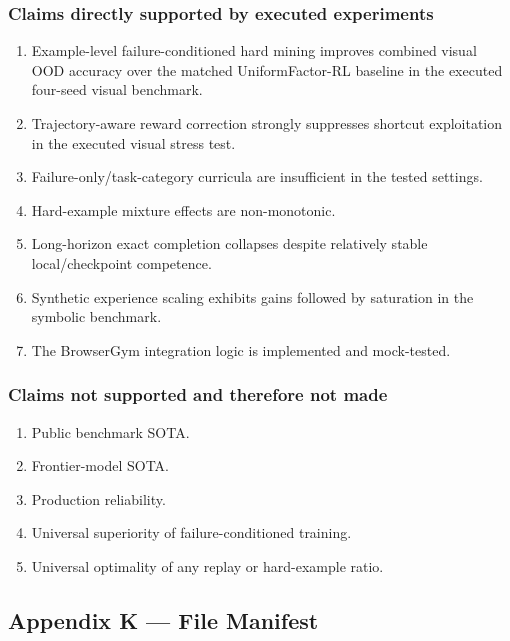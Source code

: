 \documentclass[
]{article}
\providecommand{\tightlist}{%
  \setlength{\itemsep}{0pt}\setlength{\parskip}{0pt}}
\begin{document}
\subsubsection{Claims directly supported by executed
experiments}\label{claims-directly-supported-by-executed-experiments}

\begin{enumerate}
\def\labelenumi{\arabic{enumi}.}
\tightlist
\item
  Example-level failure-conditioned hard mining improves combined visual
  OOD accuracy over the matched UniformFactor-RL baseline in the
  executed four-seed visual benchmark.
\item
  Trajectory-aware reward correction strongly suppresses shortcut
  exploitation in the executed visual stress test.
\item
  Failure-only/task-category curricula are insufficient in the tested
  settings.
\item
  Hard-example mixture effects are non-monotonic.
\item
  Long-horizon exact completion collapses despite relatively stable
  local/checkpoint competence.
\item
  Synthetic experience scaling exhibits gains followed by saturation in
  the symbolic benchmark.
\item
  The BrowserGym integration logic is implemented and mock-tested.
\end{enumerate}

\subsubsection{Claims not supported and therefore not
made}\label{claims-not-supported-and-therefore-not-made}

\begin{enumerate}
\def\labelenumi{\arabic{enumi}.}
\tightlist
\item
  Public benchmark SOTA.
\item
  Frontier-model SOTA.
\item
  Production reliability.
\item
  Universal superiority of failure-conditioned training.
\item
  Universal optimality of any replay or hard-example ratio.
\end{enumerate}

\subsection{Appendix K --- File
Manifest}\label{appendix-k-file-manifest}
\end{document}
